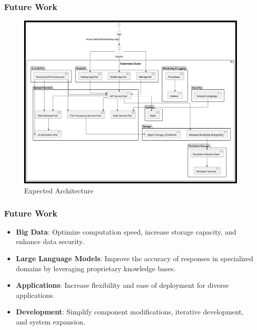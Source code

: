 \documentclass{beamer}
\begin{document}

\begin{frame}
\frametitle{Future Work}

\begin{figure}
    \centering
    \includegraphics[width=0.9\linewidth]{1720778700094.jpg}
    \caption{Expected Architecture}
    \label{fig:my_label}
\end{figure}

\end{frame}

\begin{frame}
\frametitle{Future Work}
\begin{itemize}
    \item \textbf{Big Data}: Optimize computation speed, increase storage capacity, and enhance data security.
    \item \textbf{Large Language Models}: Improve the accuracy of responses in specialized domains by leveraging proprietary knowledge bases.
    \item \textbf{Applications}: Increase flexibility and ease of deployment for diverse applications.
    \item \textbf{Development}: Simplify component modifications, iterative development, and system expansion.
\end{itemize}
\end{frame}
\end{document}
